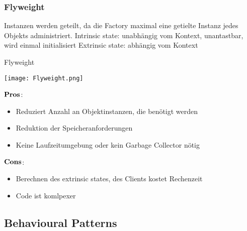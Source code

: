 \subsubsection{Flyweight}
Instanzen werden geteilt, da die Factory maximal eine getielte Instanz jedes Objekts administriert. \newline
Intrinsic state: unabhängig vom Kontext, unantastbar, wird einmal initialisiert \newline
Extrinsic state: abhängig vom Kontext
\begin{table}[H]
\caption{Flyweight}
\texttt{[image: Flyweight.png]}	
\end{table}
\begin{multicols}{2}
$\bold{Pros}$:
\begin{itemize}
	\item Reduziert Anzahl an Objektinstanzen, die benötigt werden
	\item Reduktion der Speicheranforderungen
	\item Keine Laufzeitumgebung oder kein Garbage Collector nötig
\end{itemize}
\columnbreak
$\bold{Cons}$:
\begin{itemize}
	\item Berechnen des extrinsic states, des Clients kostet Rechenzeit
	\item Code ist komlpexer
\end{itemize}
\end{multicols}
\subsection{Behavioural Patterns}















